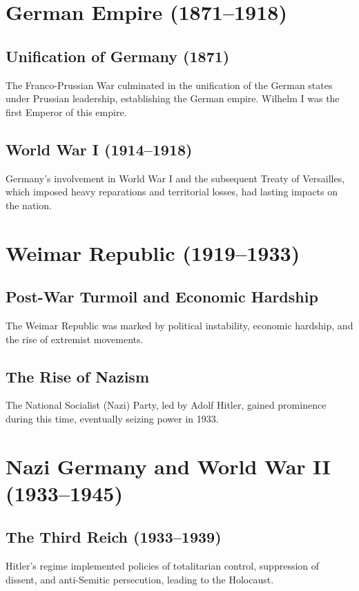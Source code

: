 \documentclass{book}
\begin{document}
\section{German Empire (1871–1918)}
\label{sec:german-empire}
\subsection{Unification of Germany (1871)}
The Franco-Prussian War culminated in the unification of the German states under Prussian leadership, establishing the German empire. Wilhelm I was the first Emperor of this empire.

\subsection{World War I (1914–1918)}
Germany’s involvement in World War I and the subsequent Treaty of Versailles, which imposed heavy reparations and territorial losses, had lasting impacts on the nation.

\section{Weimar Republic (1919–1933)}
\label{sec:weimar-republic}
\subsection{Post-War Turmoil and Economic Hardship}
The Weimar Republic was marked by political instability, economic hardship, and the rise of extremist movements.

\subsection{The Rise of Nazism}
The National Socialist (Nazi) Party, led by Adolf Hitler, gained prominence during this time, eventually seizing power in 1933.

\section{Nazi Germany and World War II (1933–1945)}
\label{sec:nazi-germany-ww2}
\subsection{The Third Reich (1933–1939)}
Hitler’s regime implemented policies of totalitarian control, suppression of dissent, and anti-Semitic persecution, leading to the Holocaust.
\end{document}
